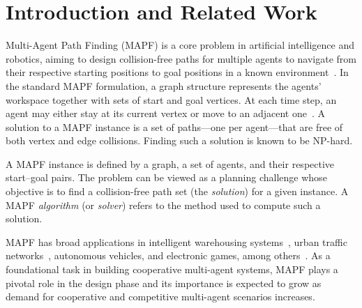 \documentclass[sigconf]{acmart}
\begin{document}

\maketitle

\section{Introduction and Related Work}

Multi-Agent Path Finding (MAPF) is a core problem in artificial
intelligence and robotics, aiming to design collision-free paths
for multiple agents to navigate from their respective starting
positions to goal positions in a known
environment~\cite{wang2023scrimp}.
In the standard MAPF formulation, a graph structure represents the
agents' workspace together with sets of start and goal
vertices.
At each time step, an agent may either stay at its current vertex
or move to an adjacent one~\cite{li2021lifelong}.
A solution to a MAPF instance is a set of paths—one per agent—that
are free of both vertex and edge collisions.
Finding such a solution is known to be NP-hard.

A MAPF instance is defined by a graph, a set of agents, and their
respective start–goal pairs.
The problem can be viewed as a planning challenge whose objective
is to find a collision-free path set (the \emph{solution}) for a
given instance.
A MAPF \emph{algorithm} (or \emph{solver}) refers to the method
used to compute such a solution.

MAPF has broad applications in intelligent warehousing
systems~\cite{zhang2023warehouse}, urban traffic
networks~\cite{dresner2008multiagent}, autonomous
vehicles, and electronic games, among
others~\cite{ma2022graph}.
As a foundational task in building cooperative multi-agent
systems, MAPF plays a pivotal role in the design phase and its
importance is expected to grow as demand for cooperative and
competitive multi-agent scenarios increases.

\end{document}
